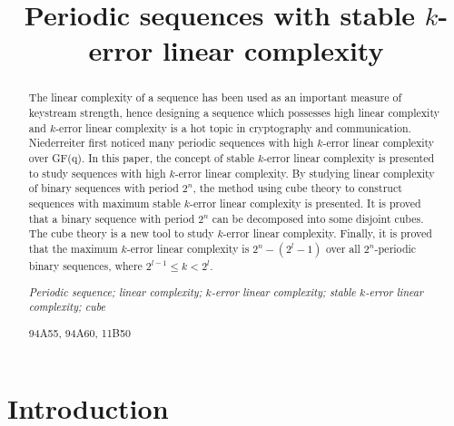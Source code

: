 \documentclass[10pt,conference,twocolumn]{IEEEtran}
\begin{document}
\pagestyle{headings}  \vspace{1cm}

\title{Periodic sequences with stable $k$-error linear complexity}


\author{
}
\maketitle              
\begin{abstract}
The linear complexity of a sequence has been used as an important
measure of keystream strength, hence designing a sequence which
possesses high linear complexity and $k$-error linear complexity is
a hot topic in cryptography and communication. Niederreiter first
noticed many periodic sequences with high $k$-error linear
complexity over GF(q). In this paper, the concept of stable
$k$-error linear complexity is presented to study sequences with
high $k$-error linear complexity. By studying linear complexity of
binary sequences with period $2^n$, the method using cube theory to
construct sequences with maximum stable $k$-error linear complexity
is presented.  It is  proved that a binary sequence with period
$2^n$ can be decomposed into some disjoint cubes. The cube theory is
a new tool to  study $k$-error linear complexity. Finally, it is
proved that the maximum  $k$-error linear complexity is
$2^n-(2^l-1)$ over all $2^n$-periodic binary sequences, where
$2^{l-1}\le k<2^{l}$.

 {\it Periodic sequence; linear complexity;
$k$-error linear complexity; stable $k$-error linear complexity;
cube}

 94A55, 94A60, 11B50
\end{abstract}

\section{Introduction}
\end{document}
